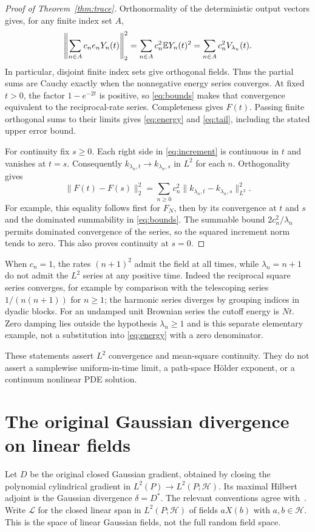\documentclass[11pt]{article}
\newcommand{\Hh}{\mathcal H}\newcommand{\tr}{\operatorname{tr}}
\begin{document}
\begin{proof}[Proof of Theorem~\ref{thm:trace}]
Orthonormality of the deterministic output vectors gives, for any
finite index set $A$,
\begin{equation}\label{eq:finiteenergy}
 \left\|\sum_{n\in A}c_ne_nY_n(t)\right\|_2^2
 =\sum_{n\in A}c_n^2\mathbb E Y_n(t)^2
 =\sum_{n\in A}c_n^2V_{\lambda_n}(t).
\end{equation}
In particular, disjoint finite index sets give orthogonal fields.
Thus the partial sums are Cauchy exactly when the nonnegative energy
series converges. At fixed $t>0$, the factor $1-e^{-2t}$ is positive,
so \eqref{eq:bounds} makes that convergence equivalent to the
reciprocal-rate series. Completeness gives $F(t)$.
Passing finite orthogonal sums to their limits gives \eqref{eq:energy}
and \eqref{eq:tail}, including the stated upper error bound.

For continuity fix $s\geq0$. Each right side in
\eqref{eq:increment} is continuous in $t$ and vanishes at $t=s$.
Consequently $k_{\lambda_n,t}\to k_{\lambda_n,s}$ in $L^2$ for each
$n$. Orthogonality gives
\begin{equation}\label{eq:fieldincrement}
 \|F(t)-F(s)\|_2^2
 =\sum_{n\geq0}c_n^2\|k_{\lambda_n,t}-k_{\lambda_n,s}\|_{L^2}^2.
\end{equation}
For example, this equality follows first for $F_N$, then by its
convergence at $t$ and $s$ and the dominated summability in
\eqref{eq:bounds}. The summable bound $2c_n^2/\lambda_n$ permits
dominated convergence of the series, so the squared increment norm
tends to zero. This also proves continuity at $s=0$.
\end{proof}

When $c_n=1$, the rates $(n+1)^2$ admit the field at all times, while
$\lambda_n=n+1$ do not admit the $L^2$ series at any positive time.
Indeed the reciprocal square series converges, for example by
comparison with the telescoping series $1/(n(n+1))$ for $n\geq1$;
the harmonic series diverges by grouping indices in dyadic blocks.
For an undamped unit Brownian series the cutoff energy is $Nt$.
Zero damping lies outside the hypothesis $\lambda_n\geq1$ and is
this separate elementary example, not a substitution into
\eqref{eq:energy} with a zero denominator.

These statements assert $L^2$ convergence and mean-square continuity.
They do not assert a samplewise uniform-in-time limit, a path-space
H\"older exponent, or a continuum nonlinear PDE solution.

\section{The original Gaussian divergence on linear fields}
Let $D$ be the original closed Gaussian gradient, obtained by closing
the polynomial cylindrical gradient in $L^2(P)\to L^2(P;\Hh)$.
Its maximal Hilbert adjoint is the Gaussian divergence $\delta=D^*$.
The relevant conventions agree with~\cite{SV}. Write
$\mathcal L$ for the closed linear span in $L^2(P;\Hh)$ of fields
$aX(b)$ with $a,b\in\Hh$. This is the space of linear Gaussian fields,
not the full random field space.
\end{document}
